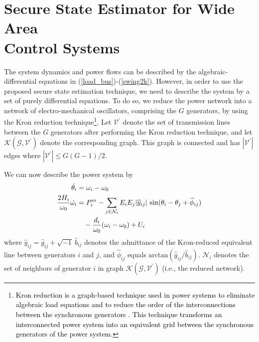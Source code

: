 \section{Secure State Estimator for Wide Area \\Control Systems}\label{sec:application1}
The system dynamics and power flows can be described by the algebraic-differential equations in (\ref{load_bus})-(\ref{swing2k}). However, in order to use the proposed secure state estimation technique, we need to describe the system by a set of purely differential equations. To do so, we reduce the power network into a network of electro-mechanical oscillators, comprising the $G$ generators, by using the Kron reduction technique\footnote{\textcolor{black}{Kron reduction is a graph-based technique  used in power systems to eliminate algebraic load equations and to reduce the order of the interconnections between the synchronous generators \cite{kron}. This technique transforms an interconnected power system into an equivalent grid between the synchronous generators of the power system.}}. Let $\mathcal{V}^\prime$ denote the set of transmission lines between the $G$ generators after performing the Kron reduction technique, and let $\mathcal{K}(\mathcal{G},\mathcal{V}^\prime)$ denote the corresponding graph. This graph is connected and has $|\mathcal{V}^\prime|$ edges where $|\mathcal{V}^\prime| \le G (G-1)/2$.






We can now describe the power system by
\begin{equation}\label{eq:kron}
\begin{aligned}
\dot{\theta_i} & =\omega_i-\omega_0\\
\frac{2H_i}{\omega_0} \dot{\omega_i} &=P_i^m-\sum_{j\in\mathcal{N}_i}{{E_i E_j {|\widehat{y}_{ij}|} ~ \text{sin}(\theta_i-\theta_j+\widehat{\phi}_{ij})}}\\
&\quad-\textcolor{black}{\frac{d_i}{\omega_0} (\omega_i-\omega_0)}+ U_i
\end{aligned}
\end{equation}
where $\widehat{y}_{ij}=\widehat{g}_{ij}+\sqrt{-1} ~\widehat{b}_{ij}$ denotes the admittance of the Kron-reduced equivalent line between generators $i$ and $j$, and $\widehat{\phi}_{ij}$ equals $\text{arctan}(\widehat{g}_{ij}/\widehat{b}_{ij})$. $\mathcal{N}_i$ denotes the set of neighbors of generator $i$ in graph $\mathcal{K}(\mathcal{G},\mathcal{V}^\prime)$ (i.e., the reduced network).


